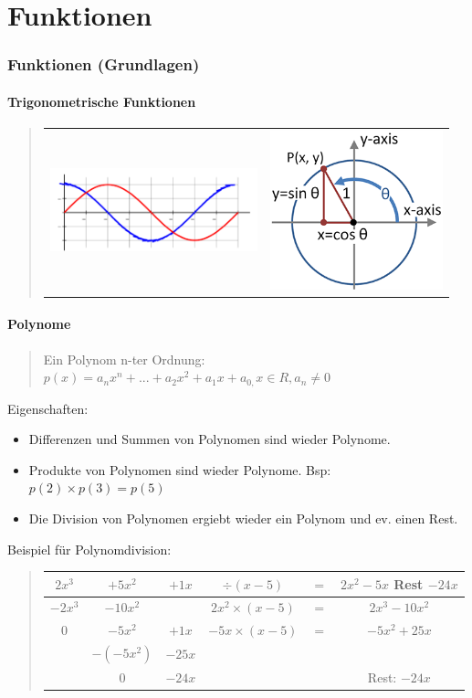 
\part*{Funktionen}


\section*{Funktionen (Grundlagen)}


\subsection*{Trigonometrische Funktionen}
\begin{quote}
\begin{tabular}{cc}
\includegraphics[width=6cm]{Funktionen/Sine_cosine_one_period} & \includegraphics[width=5cm]{Funktionen/trigfun}\tabularnewline
\end{tabular}
\end{quote}

\subsection*{Polynome}
\begin{quote}
Ein Polynom n-ter Ordnung: $p(x)=a_{n}x^{n}+...+a_{2}x^{2}+a_{1}x+a_{0,}x\in R,a_{n}\neq0$
\end{quote}
Eigenschaften:
\begin{itemize}
\item Differenzen und Summen von Polynomen sind wieder Polynome.
\item Produkte von Polynomen sind wieder Polynome. Bsp: $p(2)\times p(3)=p(5)$
\item Die Division von Polynomen ergiebt wieder ein Polynom und ev. einen
Rest.
\end{itemize}
Beispiel für Polynomdivision:
\begin{verse}
\begin{tabular}{cccccc}
$2x$$^{3}$ & $+5x$$^{2}$ & $+1x$ & $\div(x-5)$ & $=$ & $2x^{2}-5x$ Rest $-24x$\tabularnewline
\hline 
$-2x^{3}$ & $-10x^{2}$ &  & $2x^{2}\times(x-5)$ & $=$ & $2x^{3}-10x^{2}$\tabularnewline
\cline{1-2} 
$0$ & $-5x^{2}$ & $+1x$ & $-5x\times(x-5)$ & $=$ & $-5x^{2}+25x$\tabularnewline
\cline{2-3} 
 & $-(-5x^{2})$ & $-25x$ &  &  & \tabularnewline
\cline{2-3} 
 & $0$ & $-24x$ &  &  & Rest: $-24x$\tabularnewline
\end{tabular}
\end{verse}

